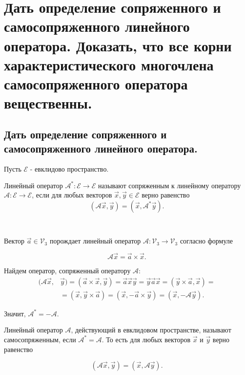 \section{
    Дать определение сопряженного и самосопряженного линейного оператора. Доказать, что все корни характеристического многочлена самосопряженного оператора вещественны.
}

\subsection{
    Дать определение сопряженного и самосопряженного линейного оператора.
}

Пусть $\mathcal{E}$ - евклидово пространство.

\begin{definition}
    Линейный оператор $\mathscr{A^*} \colon \mathcal{E} \to \mathcal{E}$ называют сопряженным к линейному оператору $\mathscr{A} \colon \mathcal{E} \to \mathcal{E}$, если для любых векторов $\vec{x}, \vec{y} \in \mathcal{E}$ верно равенство
    $$(\mathscr{A}\vec{x}, \vec{y}) = (\vec{x}, \mathscr{A^*}\vec{y}).$$
\end{definition}

\begin{example}~
    
    Вектор $\vec{a} \in \mathcal{V}_3$ порождает линейный оператор $\mathscr{A} \colon \mathcal{V}_3 \to \mathcal{V}_3$ согласно формуле
    
    $$\mathscr{A}\vec{x} = \vec{a} \times \vec{x}.$$

    Найдем оператор, сопряженный оператору $\mathscr{A}$:
    \begin{align*}
        (\mathscr{A}\vec{x}, &\vec{y}) = (\vec{a} \times \vec{x}, \vec{y}) = \vec{a}\vec{x}\vec{y} = \vec{y}\vec{a}\vec{x} = (\vec{y} \times \vec{a}, \vec{x}) = \\
        &= (\vec{x}, \vec{y} \times \vec{a}) = (\vec{x}, -\vec{a} \times \vec{y}) = (\vec{x}, -\mathscr{A}\vec{y}).
    \end{align*}

    Значит, $\mathscr{A^*} = -\mathscr{A}.$
\end{example}

\begin{definition}
    Линейный оператор $\mathscr{A}$, действующий в евклидовом пространстве, называют самосопряженным, если $\mathscr{A^*} = \mathscr{A}$. То есть для любых векторов $\vec{x}$ и $\vec{y}$ верно равенство

    $$(\mathscr{A}\vec{x}, \vec{y}) = (\vec{x}, \mathscr{A}\vec{y}).$$
\end{definition}

